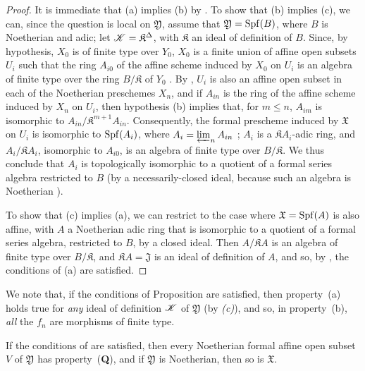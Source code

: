 \begin{proof}
\label{proof-1.10.13.1}
It is immediate that (a) implies (b) by .
To show that (b) implies (c), we can, since the question is local on $\mathfrak{Y}$, assume that $\mathfrak{Y}=\operatorname{Spf}(B)$, where $B$ is Noetherian and adic;
let $\mathscr{K}=\mathfrak{K}^\Delta$, with $\mathfrak{K}$ an ideal of definition of $B$.
Since, by hypothesis, $X_0$ is of finite type over $Y_0$, $X_0$ is a finite union of affine open subsets $U_i$ such that the ring $A_{i0}$ of the affine scheme induced by $X_0$ on $U_i$ is an algebra of finite type over the ring $B/\mathfrak{K}$ of $Y_0$ .
By , $U_i$ is also an affine open subset in each of the Noetherian preschemes $X_n$, and if $A_{in}$ is the ring of the affine scheme induced by $X_n$ on $U_i$, then hypothesis (b) implies that, for $m\leq n$, $A_{im}$ is isomorphic to $A_{in}/\mathfrak{K}^{m+1}A_{in}$.
Consequently, the formal prescheme induced by $\mathfrak{X}$ on $U_i$ is isomorphic to $\operatorname{Spf}(A_i)$, where $A_i=\varprojlim_n A_{in}$ ;
$A_i$ is a $\mathfrak{K}A_i$-adic ring, and $A_i/\mathfrak{K}A_i$, isomorphic to $A_{i0}$, is an algebra of finite type over $B/\mathfrak{K}$.
We thus conclude  that $A_i$ is topologically isomorphic to a quotient of a formal series algebra restricted to $B$ (by a necessarily-closed ideal, because such an algebra is Noetherian ).

To show that (c) implies (a), we can restrict to the case where $\mathfrak{X}=\operatorname{Spf}(A)$ is also affine, with $A$ a Noetherian adic ring that is isomorphic to a quotient of a formal series algebra, restricted to $B$, by a closed ideal.
Then  $A/\mathfrak{K}A$ is an algebra of finite type over $B/\mathfrak{K}$, and $\mathfrak{K}A=\mathfrak{J}$ is an ideal of definition of $A$, and so, by , the conditions of (a) are satisfied.
\end{proof}

We note that, if the conditions of Proposition  are satisfied, then property~(a) holds true for \emph{any} ideal of definition $\mathscr{K}$ of $\mathfrak{Y}$ (by \emph{(c)}), and so, in property~(b), \emph{all} the $f_n$ are morphisms of finite type.

\begin{cor}[10.13.2]
\label{1.10.13.2}
If the conditions of  are satisfied, then every Noetherian formal affine open subset $V$ of $\mathfrak{Y}$ has property~(\textbf{Q}), and if $\mathfrak{Y}$ is Noetherian, then so is $\mathfrak{X}$.
\end{cor}

